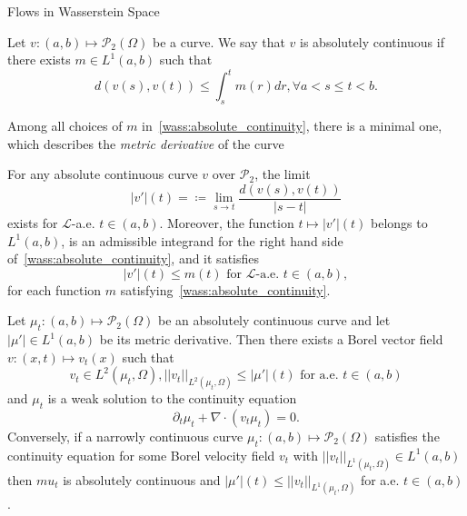 Flows in Wasserstein Space

\begin{definition}
    Let $v : (a,b) \mapsto \mathcal{P}_2(\Omega)$ be a curve.
    We say that $v$ is absolutely continuous if there exists
    $m \in L^1(a,b)$ such that
    \begin{equation}\label{wass:absolute_continuity}
        d(v(s), v(t)) \leq \int_s^t m(r) dr, \forall a < s \leq t < b.
    \end{equation}
\end{definition}

Among all choices of $m$ in~\eqref{wass:absolute_continuity}, there is a minimal
one, which describes the \textit{metric derivative} of the curve
\begin{theorem}
    For any absolute continuous curve $v$ over $\mathcal{P}_2$, the limit
    \begin{equation}
        |v'|(t) = \coloneqq \lim_{s \to t} \frac{d(v(s), v(t))}{|s - t|}
    \end{equation}
    exists for $\mathcal{L}$-a.e. $t \in (a,b)$. Moreover, the function
    $ t \mapsto |v'|(t) $ belongs to $L^1(a,b)$, is an admissible integrand for
    the right hand side of~\eqref{wass:absolute_continuity}, and it satisfies
    \begin{equation}
        |v'|(t) \leq m(t) \text{ for }\mathcal{L}\text{-a.e. } t \in (a,b),
    \end{equation}
    for each function $m$ satisfying~\eqref{wass:absolute_continuity}.
\end{theorem}

\begin{theorem}
    Let $\mu_t : (a,b) \mapsto \mathcal{P}_2(\Omega)$ be an absolutely continuous
    curve and let $|\mu'| \in L^1(a,b)$ be its metric derivative.
    Then there exists a Borel vector field $v : (x,t) \mapsto v_t(x)$ such that
    \begin{equation}
        v_t \in L^2(\mu_t, \Omega), ||v_t||_{L^2(\mu_t, \Omega)} \leq |\mu'|(t)\text{ for a.e. } t \in (a,b)
    \end{equation}
    and $\mu_t$ is a weak solution to the continuity equation
    \begin{equation}
        \partial_t \mu_t + \nabla \cdot (v_t \mu_t) = 0.
    \end{equation}
    Conversely, if a narrowly continuous curve 
    $\mu_t : (a,b) \mapsto \mathcal{P}_2(\Omega)$
    satisfies the continuity equation for some Borel velocity field $v_t$ with
    $||v_t||_{L^1(\mu_t, \Omega)} \in L^1(a,b)$ then $mu_t$ is absolutely continuous
    and $ |\mu'|(t) \leq  ||v_t||_{L^1(\mu_t, \Omega)}$ for a.e. $t \in (a,b)$.
\end{theorem}

